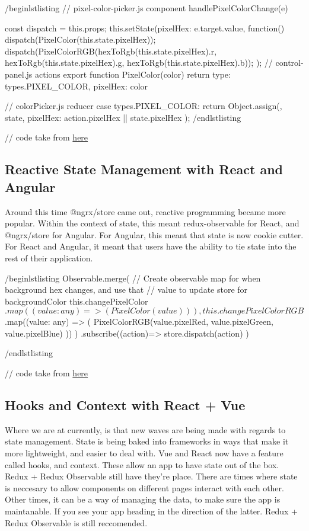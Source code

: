/begin{lstlisting}
// pixel-color-picker.js component
handlePixelColorChange(e){
    const {dispatch} = this.props;
    this.setState({pixelHex: e.target.value}, function(){
        dispatch(PixelColor(this.state.pixelHex));
        dispatch(PixelColorRGB(hexToRgb(this.state.pixelHex).r, hexToRgb(this.state.pixelHex).g, hexToRgb(this.state.pixelHex).b));
    });
// control-panel.js actions
export function PixelColor(color){
  return{
    type: types.PIXEL\_COLOR,
    pixelHex: color
  }
}

// colorPicker.js reducer
case types.PIXEL\_COLOR:
  return Object.assign({}, state, {
    pixelHex: action.pixelHex || state.pixelHex
  });
/end{lstlisting}

// code take from \href{https://github.com/CharlieGreenman/pixelLight}{here}

\subsection{ Reactive State Management with React and Angular }
Around this time @ngrx/store came out, reactive programming became more popular.
Within the context of state, this meant redux-observable for React, and
@ngrx/store for Angular. For Angular, this meant that state is now cookie
cutter. For React and Angular, it meant that users have the ability to tie state into the
rest of their application.

/begin{lstlisting}
Observable.merge(
  // Create observable map for  when background hex changes, and use that
  // value to update store for backgroundColor
  this.changePixelColor$.map((value: any) => (
    PixelColor(value)
  )),
  this.changePixelColorRGB$.map((value: any) => (
    PixelColorRGB(value.pixelRed, value.pixelGreen,
      value.pixelBlue)
  ))
)
.subscribe((action)=>{
  store.dispatch(action)
})
}
/end{lstlisting}

// code take from \href{https://github.com/CharlieGreenman/angularPixel_illustrator}{here}

\subsection{ Hooks and Context with React + Vue }
Where we are at currently, is that new waves are being made with regards to
state management. State is being baked into frameworks in ways that make it
more lightweight, and easier to deal with. Vue and React now have a feature
called hooks, and context. These allow an app to have state out of the box.
Redux + Redux Observable still have they're place. There are times where state
is neccesary to allow components on different pages interact with each other.
Other times, it can be a way of managing the data, to make sure the app is
maintanable. If you see your app heading in the direction of the latter. Redux +
Redux Observable is still reccomended.

